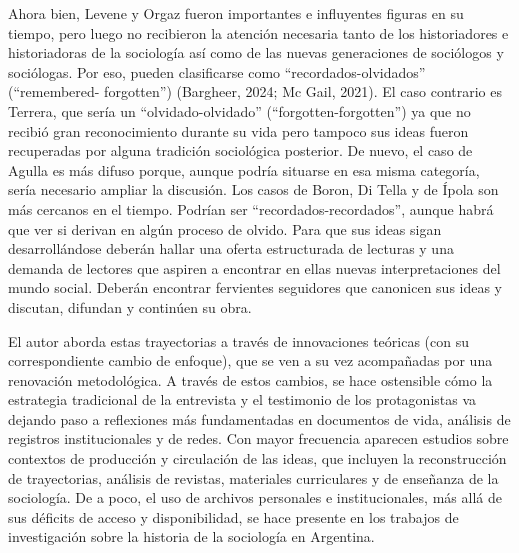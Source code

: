 Ahora bien, Levene y Orgaz fueron importantes e influyentes figuras en su tiempo, pero luego no recibieron la atención necesaria tanto de los historiadores e historiadoras de la sociología así como de las nuevas generaciones de sociólogos y sociólogas. Por eso, pueden clasificarse como ``recordados-olvidados'' (``remembered- forgotten'') (Bargheer, 2024; Mc Gail, 2021). El caso contrario es Terrera, que sería un ``olvidado-olvidado'' (``forgotten-forgotten'') ya que no recibió gran reconocimiento durante su vida pero tampoco sus ideas fueron recuperadas por alguna tradición sociológica posterior. De nuevo, el caso de Agulla es más difuso porque, aunque podría situarse en esa misma categoría, sería necesario ampliar la discusión. Los casos de Boron, Di Tella y de Ípola son más cercanos en el tiempo. Podrían ser ``recordados-recordados'', aunque habrá que ver si derivan en algún proceso de olvido. Para que sus ideas sigan desarrollándose deberán hallar una oferta estructurada de lecturas y una demanda de lectores que aspiren a encontrar en ellas nuevas interpretaciones del mundo social. Deberán encontrar fervientes seguidores que canonicen sus ideas y discutan, difundan y continúen su obra.

El autor aborda estas trayectorias a través de innovaciones teóricas (con su correspondiente cambio de enfoque), que se ven a su vez acompañadas por una renovación metodológica. A través de estos cambios, se hace ostensible cómo la estrategia tradicional de la entrevista y el testimonio de los protagonistas va dejando paso a reflexiones más fundamentadas en documentos de vida, análisis de registros institucionales y de redes. Con mayor frecuencia aparecen estudios sobre contextos de producción y circulación de las ideas, que incluyen la reconstrucción de trayectorias, análisis de revistas, materiales curriculares y de enseñanza de la sociología. De a poco, el uso de archivos personales e institucionales, más allá de sus déficits de acceso y disponibilidad, se hace presente en los trabajos de investigación sobre la historia de la sociología en Argentina.


